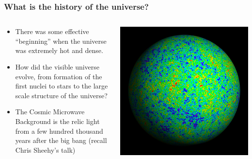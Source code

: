 \documentclass{beamer}
\begin{document}
\frame
{

    \frametitle{What is the history of the universe?}


    \begin{columns}
        \begin{column}{0.5\textwidth}
            \begin{itemize}

                \item There was some effective ``beginning'' when the universe
                    was extremely hot and dense.

                \item How did the visible universe evolve, from formation of
                    the first nuclei to stars to the large scale structure of
                    the universe?

                \item The Cosmic Microwave Background is the relic light from
                    a few hundred thousand years after the big bang (recall
                    Chris Sheehy's talk)

            \end{itemize}
        \end{column}
        \begin{column}{0.5\textwidth}
            \begin{center}
                \includegraphics[width=\textwidth]{wiener3yr_map_2284x2284.jpg}
            \end{center}
        \end{column}
    \end{columns}


}
\end{document}

